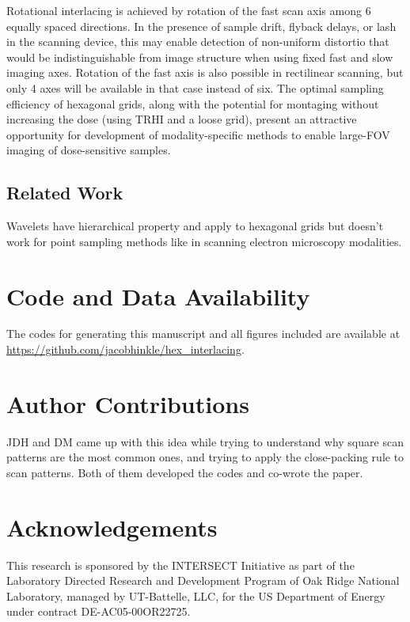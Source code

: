 \documentclass[aip, amsmath, amssymb, nobibnotes, nofootinbib, citeautoscript, reprint, superscriptaddress]{revtex4-2}
\begin{document}
    Rotational interlacing is achieved by rotation of the fast scan axis among 6 equally spaced directions.
    In the presence of sample drift, flyback delays, or lash in the scanning device, this may enable detection of non-uniform distortio that would be indistinguishable from image structure when using fixed fast and slow imaging axes.
    Rotation of the fast axis is also possible in rectilinear scanning, but only 4 axes will be available in that case instead of six.
    The optimal sampling efficiency of hexagonal grids, along with the potential for montaging without increasing the dose (using TRHI and a loose grid), present an attractive opportunity for development of modality-specific methods to enable large-FOV imaging of dose-sensitive samples.

    \subsection{\label{ssec:wavelets}Related Work}

    Wavelets have hierarchical property and apply to hexagonal grids \cite{hex_compression} but doesn't work for point sampling methods like in scanning electron microscopy modalities.

    \section{Code and Data Availability}

    The codes for generating this manuscript and all figures included are available at \url{https://github.com/jacobhinkle/hex_interlacing}. 

    \section{\label{sec:contribs}Author Contributions}
    JDH and DM came up with this idea while trying to understand why square scan patterns are the most common ones, and trying to apply the close-packing rule to scan patterns. Both of them developed the codes and co-wrote the paper.

    \section{\label{sec:acknowledgement}Acknowledgements}

    This research is sponsored by the INTERSECT Initiative as part of the Laboratory Directed Research and Development Program of Oak Ridge National Laboratory, managed by UT-Battelle, LLC, for the US Department of Energy under contract DE-AC05-00OR22725. 
    
    
\end{document}
